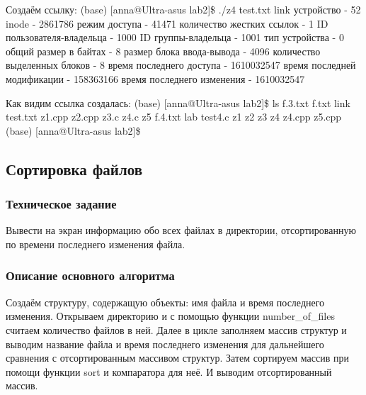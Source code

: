 \documentclass[a4paper,12pt]{extarticle}
\begin{document}
Создаём ссылку:\newline
(base) [anna@Ultra-asus lab2]\$ ./z4 test.txt link\newline
устройство - 52\newline
inode - 2861786\newline
режим доступа - 41471\newline
количество жестких ссылок - 1\newline
ID пользователя-владельца - 1000\newline
ID группы-владельца - 1001\newline
тип устройства - 0\newline
общий размер в байтах - 8\newline
размер блока ввода-вывода - 4096\newline
количество выделенных блоков - 8\newline
время последнего доступа - 1610032547\newline
время последней модификации - 158363166\newline
время последнего изменения - 1610032547\newline

Как видим ссылка создалась:\newline
(base) [anna@Ultra-asus lab2]\$ ls\newline
f.3.txt  f.txt  link     test.txt  z1.cpp  z2.cpp  z3.c  z4.c    z5\newline
f.4.txt  lab    test4.c  z1        z2      z3      z4    z4.cpp \newline z5.cpp\newline
(base) [anna@Ultra-asus lab2]\$\newline

\subsection{Сортировка файлов}
\subsubsection{Техническое задание}
Вывести на экран информацию обо всех файлах в директории, отсортированную по времени последнего изменения файла. 

\subsubsection{Описание основного алгоритма}
Создаём структуру, содержащую объекты: имя файла и время последнего изменения. Открываем директорию и с помощью функции number\_of\_files считаем количество файлов в ней. Далее в цикле заполняем массив структур и выводим название файла и время последнего изменения для дальнейшего сравнения с отсортированным массивом структур. Затем сортируем массив при помощи функции sort и компаратора для неё. И выводим отсортированный массив.
\end{document}
